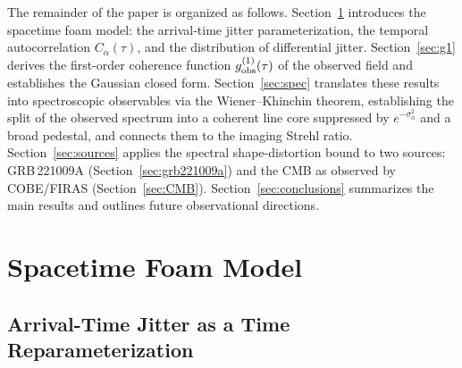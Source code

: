 \documentclass[aps,prd,onecolumn,amsmath,amssymb]{revtex4-2}
\begin{document}
The remainder of the paper is organized as follows.
Section~\ref{sec:model} introduces the spacetime foam model: the
arrival-time jitter parameterization, the temporal autocorrelation
$C_\alpha(\tau)$, and the distribution of differential jitter.
Section~\ref{sec:g1} derives the first-order coherence function
$g^{(1)}_{\rm obs}(\tau)$ of the observed field and establishes the
Gaussian closed form.
Section~\ref{sec:spec} translates these results into spectroscopic observables
via the Wiener--Khinchin theorem, establishing the split of the observed
spectrum into a coherent line core suppressed by $e^{-\sigma_\phi^2}$ and a
broad pedestal, and connects them to the imaging Strehl ratio.
Section~\ref{sec:sources} applies the spectral shape-distortion bound to two sources:
GRB\,221009A (Section~\ref{sec:grb221009a}) and the CMB as observed by
COBE/FIRAS (Section~\ref{sec:CMB}).
Section~\ref{sec:conclusions} summarizes the main results and outlines future
observational directions.

\section{Spacetime Foam Model}
\label{sec:model}

\subsection{Arrival-Time Jitter as a Time Reparameterization}
\end{document}
